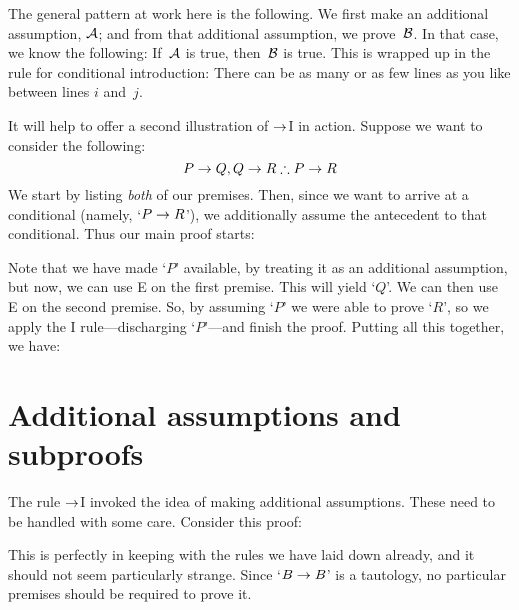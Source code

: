 The general pattern at work here is the following. We first make an additional assumption, $\mathcal{A}$; and from that additional assumption, we prove~$\mathcal{B}$. In that case, we know the following: If~$\mathcal{A}$ is true, then~$\mathcal{B}$ is true. This is wrapped up in the rule for conditional introduction:
There can be as many or as few lines as you like between lines $i$
and~$j$.

It will help to offer a second  illustration of $\rightarrow$I in action. Suppose we want to consider the following:
	$$P \eif Q, Q \eif R \therefore P \eif R$$
We start by listing \emph{both} of our premises. Then, since we want to arrive at a conditional (namely, `$P \rightarrow R$'), we additionally assume the antecedent to that conditional. Thus our main proof starts:
\begin{fitchproof}
	\PR
	\PR
	\open
		\AS
	\close
\end{fitchproof}
Note that we have made `$P$' available, by treating it as an additional assumption, but now, we can use {\eif}E on the first premise. This will yield `$Q$'. We can then use {\eif}E on the second premise. So, by assuming `$P$' we were able to prove `$R$', so we apply the {\eif}I rule---discharging `$P$'---and finish the proof. Putting all this together, we have:
\label{HSproof}
\begin{fitchproof}
	\PR
	\PR
	\open
		\AS
	\close
\end{fitchproof}


\section{Additional assumptions and subproofs}
The rule $\rightarrow$I invoked the idea of making additional assumptions. These need to be handled with some care. Consider this proof:
\begin{fitchproof}
	\PR
	\open
		\AS
		 
	\close
\end{fitchproof}
This is perfectly in keeping with the rules we have laid down already, and it should not seem particularly strange. Since `$B \rightarrow B$' is a tautology, no particular premises should be required to prove it.

